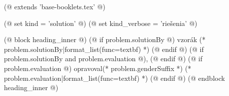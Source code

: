 (@ extends 'base-booklets.tex' @)

(@ set kind = 'solution' @)
(@ set kind_verbose = 'riešenia' @)

(@ block heading_inner @)
    (@ if problem.solutionBy @)%
        vzorák (* problem.solutionBy|format_list(func=textbf) *)%
    (@ endif @)%
    (@ if problem.solutionBy and problem.evaluation @), (@ endif @)%
    (@ if problem.evaluation @)%
        opravoval(* problem.genderSuffix *) (* problem.evaluation|format_list(func=textbf) *)%
    (@ endif @)%
(@ endblock heading_inner @)
